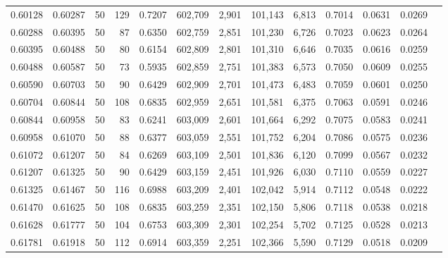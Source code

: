 \begin{tabular}{rrrrrrrrrrrrr}
0.60128 & 0.60287 &    50 & 129 &                                     0.7207 & 602,709 &   2,901 & 101,143 &   6,813 & 0.7014 & 0.0631 & 0.0269 \\
0.60288 & 0.60395 &    50 &  87 &                                     0.6350 & 602,759 &   2,851 & 101,230 &   6,726 & 0.7023 & 0.0623 & 0.0264 \\
0.60395 & 0.60488 &    50 &  80 &                                     0.6154 & 602,809 &   2,801 & 101,310 &   6,646 & 0.7035 & 0.0616 & 0.0259 \\
0.60488 & 0.60587 &    50 &  73 &                                     0.5935 & 602,859 &   2,751 & 101,383 &   6,573 & 0.7050 & 0.0609 & 0.0255 \\
0.60590 & 0.60703 &    50 &  90 &                                     0.6429 & 602,909 &   2,701 & 101,473 &   6,483 & 0.7059 & 0.0601 & 0.0250 \\
0.60704 & 0.60844 &    50 & 108 &                                     0.6835 & 602,959 &   2,651 & 101,581 &   6,375 & 0.7063 & 0.0591 & 0.0246 \\
0.60844 & 0.60958 &    50 &  83 &                                     0.6241 & 603,009 &   2,601 & 101,664 &   6,292 & 0.7075 & 0.0583 & 0.0241 \\
0.60958 & 0.61070 &    50 &  88 &                                     0.6377 & 603,059 &   2,551 & 101,752 &   6,204 & 0.7086 & 0.0575 & 0.0236 \\
0.61072 & 0.61207 &    50 &  84 &                                     0.6269 & 603,109 &   2,501 & 101,836 &   6,120 & 0.7099 & 0.0567 & 0.0232 \\
0.61207 & 0.61325 &    50 &  90 &                                     0.6429 & 603,159 &   2,451 & 101,926 &   6,030 & 0.7110 & 0.0559 & 0.0227 \\
0.61325 & 0.61467 &    50 & 116 &                                     0.6988 & 603,209 &   2,401 & 102,042 &   5,914 & 0.7112 & 0.0548 & 0.0222 \\
0.61470 & 0.61625 &    50 & 108 &                                     0.6835 & 603,259 &   2,351 & 102,150 &   5,806 & 0.7118 & 0.0538 & 0.0218 \\
0.61628 & 0.61777 &    50 & 104 &                                     0.6753 & 603,309 &   2,301 & 102,254 &   5,702 & 0.7125 & 0.0528 & 0.0213 \\
0.61781 & 0.61918 &    50 & 112 &                                     0.6914 & 603,359 &   2,251 & 102,366 &   5,590 & 0.7129 & 0.0518 & 0.0209 \\

\end{tabular}
